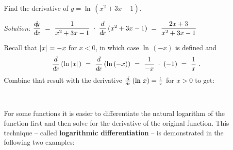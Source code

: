 \begin{exmp}\label{exmp:derivlnx2}
 Find the derivative of $y = \ln\,\left(x^2 + 3x - 1\right)$.\vspace{1mm}
 \par\noindent\emph{Solution:} $\dfrac{d\negmedspace y}{d\!x} ~=~ \dfrac{1}{x^2 + 3x - 1} \;\cdot\;
 \dfrac{d}{d\!x}\,(x^2 + 3x - 1) ~=~ \dfrac{2x + 3}{x^2 + 3x - 1}$
\end{exmp}
\divider
\vspace{3mm}

Recall that $\lvert\mspace{1mu}x\mspace{1mu}\rvert = -x$ for $x < 0$, in which case $\ln\,(-x)$ is
defined and
\[
 \frac{d}{d\!x}\,(\ln\,\lvert\mspace{1mu}x\mspace{1mu}\rvert) ~=~ \frac{d}{d\!x}\,(\ln\,(-x)) ~=~ \frac{1}{-x} \;\cdot\; (-1) ~=~ \frac{1}{x} ~.
\]
\newpage
Combine that result with the derivative $\frac{d}{d\!x}\,(\ln\,x) = \frac{1}{x}$ for
$x > 0$ to get:

\par{}\\
\par For some functions it is easier to differentiate the natural logarithm of
the function first and then solve for the derivative of the original function.
This technique -- called
\textbf{logarithmic differentiation} -- is
demonstrated in the following two examples:


